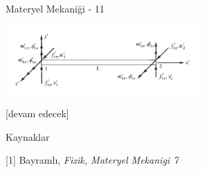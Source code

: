 \documentclass[12pt,fleqn]{article}\usepackage{../../common}
\begin{document}
Materyel Mekaniği - 11




\includegraphics[width=20em]{phy_020_strs_11_01.jpg}
















[devam edecek]

Kaynaklar

[1] Bayramlı, {\em Fizik, Materyel Mekanigi 7}
\end{document}
